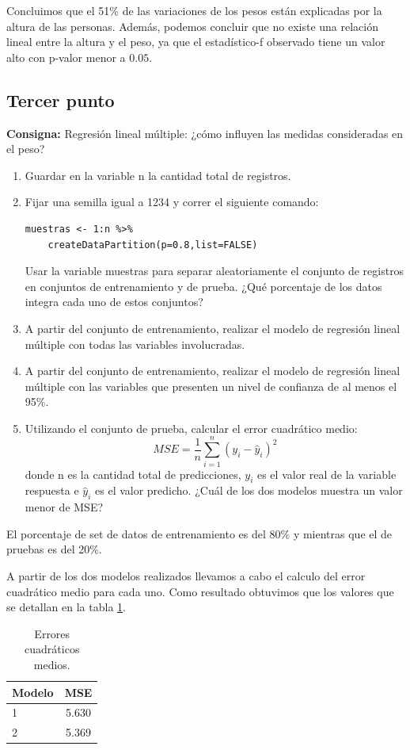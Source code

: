 \documentclass{article} %
\begin{document}
Concluimos que el 51\% de las variaciones de los pesos están explicadas por la altura de las personas. Además, podemos concluir que no existe una relación lineal entre la altura y el peso, ya que el estadístico-f observado tiene un valor alto con p-valor menor a $0.05$.

\subsection{Tercer punto}

\textbf{Consigna:} Regresión lineal múltiple: ¿cómo influyen las medidas consideradas en el peso?

\begin{enumerate}[label=(\alph*)]
\item Guardar en la variable n la cantidad total de registros.
\item Fijar una semilla igual a 1234 y correr el siguiente comando:
\begin{lstlisting}
muestras <- 1:n %>%
	createDataPartition(p=0.8,list=FALSE)
\end{lstlisting}
Usar la variable muestras para separar aleatoriamente el conjunto de registros en conjuntos de entrenamiento y de prueba. ¿Qué porcentaje de los datos integra cada uno de estos conjuntos?
\item A partir del conjunto de entrenamiento, realizar el modelo de regresión lineal múltiple con todas las variables involucradas.
\item A partir del conjunto de entrenamiento, realizar el modelo de regresión lineal múltiple con las variables que presenten un nivel de confianza de al menos el 95\%.
\item Utilizando el conjunto de prueba, calcular el error cuadrático medio:
$$
MSE=\frac{1}{n}\sum^n_{i=1}(y_i-\hat{y}_i)^2
$$
donde n es la cantidad total de predicciones, $y_i$ es el valor real de la variable respuesta e $\hat{y}_i$ es el valor predicho. ¿Cuál de los dos modelos muestra un valor menor de MSE?
\end{enumerate}

El porcentaje de set de datos de entrenamiento es del 80\% y mientras que el de pruebas es del 20\%.

A partir de los dos modelos realizados llevamos a cabo el calculo del error cuadrático medio para cada uno. Como resultado obtuvimos que los valores que se detallan en la tabla \ref{tab:table-punto-1-3}.


\begin{table}[H]
	\centering
		\begin{tabular}{||l | c ||}
			\hline
			\hline
			Modelo & MSE\\
			\hline			
			\hline
			1 & 5.630\\
			\hline
			2 & 5.369\\
			\hline
			\hline
		\end{tabular}
		\caption{Errores cuadráticos medios.}
	\label{tab:table-punto-1-3}
\end{table}
\end{document}
